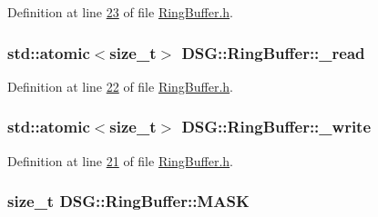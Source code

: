 Definition at line \hyperlink{_ring_buffer_8h_source_l00023}{23} of file \hyperlink{_ring_buffer_8h_source}{Ring\+Buffer.\+h}.

\hypertarget{class_d_s_g_1_1_ring_buffer_aa71bb75a5d24700be795a30e1a135a54}{
\subsubsection[{\+\_\+read}]{\setlength{\rightskip}{0pt plus 5cm}std\+::atomic$<$size\+\_\+t$>$ D\+S\+G\+::\+Ring\+Buffer\+::\+\_\+read\hspace{0.3cm}{\ttfamily [protected]}}}\label{class_d_s_g_1_1_ring_buffer_aa71bb75a5d24700be795a30e1a135a54}


Definition at line \hyperlink{_ring_buffer_8h_source_l00022}{22} of file \hyperlink{_ring_buffer_8h_source}{Ring\+Buffer.\+h}.

\hypertarget{class_d_s_g_1_1_ring_buffer_a78bd7704fd059b745bc82421e1062123}{
\subsubsection[{\+\_\+write}]{\setlength{\rightskip}{0pt plus 5cm}std\+::atomic$<$size\+\_\+t$>$ D\+S\+G\+::\+Ring\+Buffer\+::\+\_\+write\hspace{0.3cm}{\ttfamily [protected]}}}\label{class_d_s_g_1_1_ring_buffer_a78bd7704fd059b745bc82421e1062123}


Definition at line \hyperlink{_ring_buffer_8h_source_l00021}{21} of file \hyperlink{_ring_buffer_8h_source}{Ring\+Buffer.\+h}.

\hypertarget{class_d_s_g_1_1_ring_buffer_a2fba2ff6ee3886101f0f58b0fd7f3641}{
\subsubsection[{M\+A\+S\+K}]{\setlength{\rightskip}{0pt plus 5cm}size\+\_\+t D\+S\+G\+::\+Ring\+Buffer\+::\+M\+A\+S\+K\hspace{0.3cm}{\ttfamily [protected]}}}\label{class_d_s_g_1_1_ring_buffer_a2fba2ff6ee3886101f0f58b0fd7f3641}


